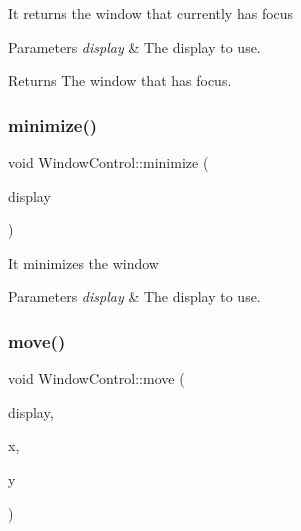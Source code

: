 It returns the window that currently has focus


\begin{DoxyParams}{Parameters}
{\em display} & The display to use.\\
\hline
\end{DoxyParams}
\begin{DoxyReturn}{Returns}
The window that has focus. 
\end{DoxyReturn}
\mbox{\label{classUbuntuController_1_1WindowControl_abb8d0ae3c43be976259181c848fa4568}} 
\subsubsection{\texorpdfstring{minimize()}{minimize()}}
{\footnotesize\ttfamily void Window\+Control\+::minimize (\begin{DoxyParamCaption}\item[{Display $\ast$}]{display }\end{DoxyParamCaption})}

It minimizes the window


\begin{DoxyParams}{Parameters}
{\em display} & The display to use. \\
\hline
\end{DoxyParams}
\mbox{\label{classUbuntuController_1_1WindowControl_a367c48d4f217a83225c8ade45e347884}} 
\subsubsection{\texorpdfstring{move()}{move()}}
{\footnotesize\ttfamily void Window\+Control\+::move (\begin{DoxyParamCaption}\item[{Display $\ast$}]{display,  }\item[{int}]{x,  }\item[{int}]{y }\end{DoxyParamCaption})}

